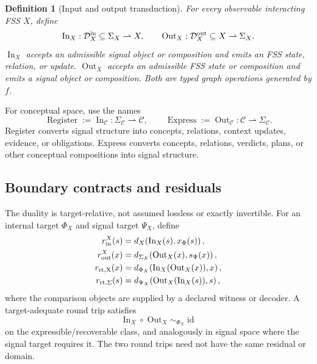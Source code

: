 \documentclass[11pt]{article}
\newtheorem{definition}{Definition}
\newcommand{\C}{\mathcal{C}}
\newcommand{\D}{\mathcal{D}}
\newcommand{\Sig}{\Sigma}
\newcommand{\InOp}{\operatorname{In}}
\newcommand{\OutOp}{\operatorname{Out}}
\newcommand{\Register}{\operatorname{Register}}
\newcommand{\Express}{\operatorname{Express}}
\begin{document}
\begin{definition}[Input and output transduction]
For every observable interacting FSS $X$, define
\begin{equation}
\InOp_X:\D_{X}^{\rm in}\subseteq\Sig_X\rightharpoonup X,
\qquad
\OutOp_X:\D_{X}^{\rm out}\subseteq X\rightharpoonup\Sig_X.
\end{equation}
$\InOp_X$ accepts an admissible signal object or composition and emits an FSS state, relation, or update. $\OutOp_X$ accepts an admissible FSS state or composition and emits a signal object or composition. Both are typed graph operations generated by $f$.
\end{definition}

For conceptual space, use the names
\begin{equation}
\Register:=\InOp_{\C}:\Sig_{\C}\rightharpoonup\C,
\qquad
\Express:=\OutOp_{\C}:\C\rightharpoonup\Sig_{\C}.
\end{equation}
Register converts signal structure into concepts, relations, context updates, evidence, or obligations. Express converts concepts, relations, verdicts, plans, or other conceptual compositions into signal structure.

\subsection{Boundary contracts and residuals}

The duality is target-relative, not assumed lossless or exactly invertible. For an internal target $\Phi_X$ and signal target $\Psi_X$, define
\begin{align}
r_{\rm in}^{X}(s)&=d_X\!\left(\InOp_X(s),x_{\Phi}(s)\right),\\
r_{\rm out}^{X}(x)&=d_{\Sig_X}\!\left(\OutOp_X(x),s_{\Psi}(x)\right),\\
r_{\rm rt,X}(x)&=d_{\Phi_X}\!\left(\InOp_X(\OutOp_X(x)),x\right),\\
r_{\rm rt,\Sig}(s)&=d_{\Psi_X}\!\left(\OutOp_X(\InOp_X(s)),s\right),
\end{align}
where the comparison objects are supplied by a declared witness or decoder. A target-adequate round trip satisfies
\begin{equation}
\InOp_X\circ\OutOp_X\sim_{\Phi_X}\operatorname{id}
\end{equation}
on the expressible/recoverable class, and analogously in signal space where the signal target requires it. The two round trips need not have the same residual or domain.
\end{document}
